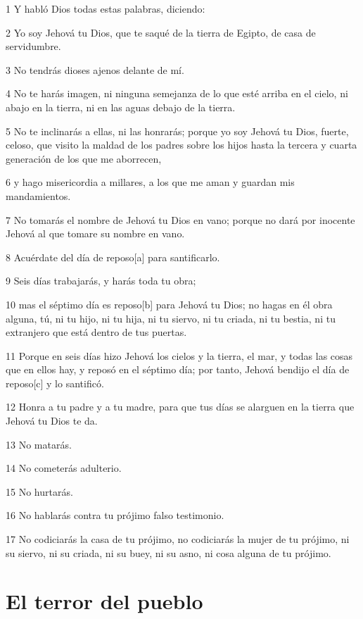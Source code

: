 \par 1 Y habló Dios todas estas palabras, diciendo:
\par 2 Yo soy Jehová tu Dios, que te saqué de la tierra de Egipto, de casa de servidumbre.
\par 3 No tendrás dioses ajenos delante de mí.
\par 4 No te harás imagen, ni ninguna semejanza de lo que esté arriba en el cielo, ni abajo en la tierra, ni en las aguas debajo de la tierra.
\par 5 No te inclinarás a ellas, ni las honrarás; porque yo soy Jehová tu Dios, fuerte, celoso, que visito la maldad de los padres sobre los hijos hasta la tercera y cuarta generación de los que me aborrecen,
\par 6 y hago misericordia a millares, a los que me aman y guardan mis mandamientos.
\par 7 No tomarás el nombre de Jehová tu Dios en vano; porque no dará por inocente Jehová al que tomare su nombre en vano.
\par 8 Acuérdate del día de reposo[a] para santificarlo.
\par 9 Seis días trabajarás, y harás toda tu obra;
\par 10 mas el séptimo día es reposo[b] para Jehová tu Dios; no hagas en él obra alguna, tú, ni tu hijo, ni tu hija, ni tu siervo, ni tu criada, ni tu bestia, ni tu extranjero que está dentro de tus puertas.
\par 11 Porque en seis días hizo Jehová los cielos y la tierra, el mar, y todas las cosas que en ellos hay, y reposó en el séptimo día; por tanto, Jehová bendijo el día de reposo[c] y lo santificó.
\par 12 Honra a tu padre y a tu madre, para que tus días se alarguen en la tierra que Jehová tu Dios te da.
\par 13 No matarás.
\par 14 No cometerás adulterio.
\par 15 No hurtarás.
\par 16 No hablarás contra tu prójimo falso testimonio.
\par 17 No codiciarás la casa de tu prójimo, no codiciarás la mujer de tu prójimo, ni su siervo, ni su criada, ni su buey, ni su asno, ni cosa alguna de tu prójimo.

\section*{El terror del pueblo}

